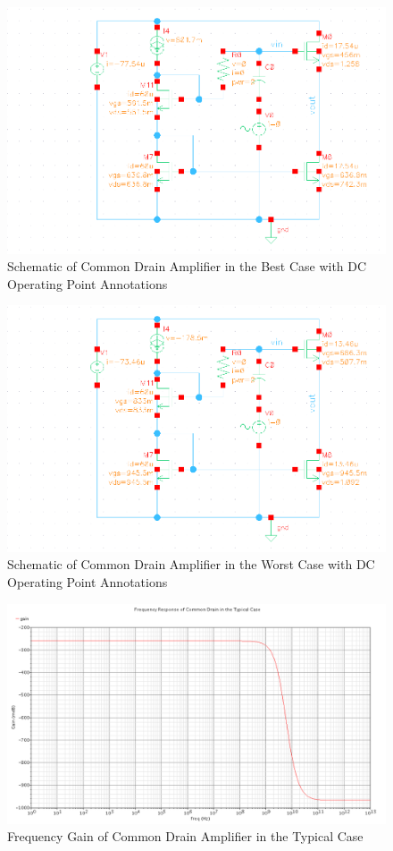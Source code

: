 \documentclass{article}
\begin{document}
\begin{figure}[H]
\centering
\includegraphics[width=6in]{2_cd_dcop_ff.png}
\caption{Schematic of Common Drain Amplifier in the Best Case with DC Operating Point Annotations}
\label{cd_dcop_ff}
\end{figure}

\begin{figure}[H]
\centering
\includegraphics[width=6in]{2_cd_dcop_ss.png}
\caption{Schematic of Common Drain Amplifier in the Worst Case with DC Operating Point Annotations}
\label{cd_dcop_ss}
\end{figure}

\begin{figure}[H]
\centering
\includegraphics[width=5in]{2_cd_gain_tt.png}
\caption{Frequency Gain of Common Drain Amplifier in the Typical Case}
\label{cd_tt}
\end{figure}
\end{document}
